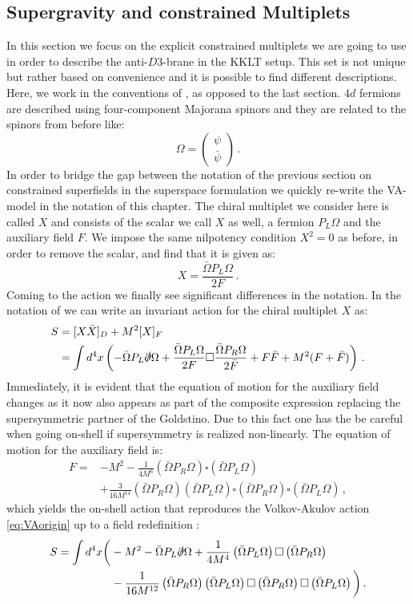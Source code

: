 \documentclass[12pt]{report}
\newcommand{\be}{\begin{equation}}
\newcommand{\ee}{\end{equation}}
\newcommand{\bea}{\begin{equation}\begin{aligned}}
\newcommand{\eea}{\end{aligned}\end{equation}}
\begin{document}
\subsection{Supergravity and constrained Multiplets}%
In this section we focus on the explicit constrained multiplets we are going to use in order to describe the anti-$D3$-brane in the KKLT setup. This set is not unique but rather based on convenience and it is possible to find different descriptions. Here, we work in the conventions of \cite{Freedman:2012zz}, as opposed to the last section. $4d$ fermions are described using four-component Majorana spinors and they are related to the spinors from before like:
\be 
\Omega = \begin{pmatrix} \psi \\ \bar{\psi}\end{pmatrix}\,.
\ee
In order to bridge the gap between the notation of the previous section on constrained superfields in the superspace formulation we quickly re-write the VA-model in the notation of this chapter. The chiral multiplet we consider here is called $X$ and consists of the scalar we call $X$ as well, a fermion $P_L \Omega$ and the auxiliary field $F$. We impose the same nilpotency condition $X^2=0$ as before, in order to remove the scalar, and find that it is given as:
\be 
X = \frac{\bar{\Omega} P_L \Omega}{2F}\,.
\ee
Coming to the action we finally see significant differences in the notation. In the notation of \cite{Freedman:2012zz} we can write an invariant action for the chiral multiplet $X$ as:
\bea 
S &= [X\bar{X}]_D + M^2 [X]_F\\
  &= \int d^4 x \left( - \bar{\Omega} P_L \slashed{\partial}\Omega + \frac{\bar{\Omega}P_L\Omega}{2F} \square \frac{\bar{\Omega}P_R\Omega}{2\bar{F}} + F \bar{F} + M^2 (F+\bar{F})\right)\,.
\label{eq:VAsusy}
\eea
Immediately, it is evident that the equation of motion for the auxiliary field changes as it now also appears as part of the composite expression replacing the supersymmetric partner of the Goldstino. Due to this fact one has the be careful when going on-shell if supersymmetry is realized non-linearly. The equation of motion for the auxiliary field is:
\bea 
F = &-M^2 - \frac{1}{4 M^6} \left(\bar{\Omega}P_R  \Omega\right) \square \left(\bar{\Omega}P_L\Omega \right) \\
&+ \frac{3}{16 M^{14}} \left(\bar{\Omega}P_R  \Omega\right)  \left(\bar{\Omega}P_L\Omega \right) \square \left(\bar{\Omega}P_R  \Omega\right) \square \left(\bar{\Omega}P_L\Omega \right)\,,
\eea
which yields the on-shell action that reproduces the Volkov-Akulov action \eqref{eq:VAorigin} up to a field redefinition \cite{Kuzenko:2011tj}:
\bea 
S = \int d^4 x \bigg( &- M^2 - \bar{\Omega}P_L \slashed{\partial} \Omega + \frac{1}{4M^4} \left(\bar{\Omega}P_L\Omega \right) \square \left(\bar{\Omega}P_R\Omega\right)\\
&- \frac{1}{16 M^{12}} \left(\bar{\Omega}P_R\Omega\right)\left(\bar{\Omega}P_L\Omega \right) \square \left(\bar{\Omega}P_R\Omega\right)\square \left(\bar{\Omega}P_L\Omega \right) \bigg)\,.
\eea
\end{document}
